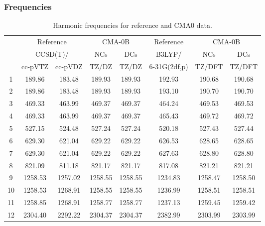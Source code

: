 \documentclass[10pt,oneside]{article}
\begin{document}
\subsubsection*{Frequencies}
\begin{table}[h!]
\centering
\caption{Harmonic frequencies for reference and CMA0 data.}
\begin{tabular}{cccccccc}
\toprule
{} & \multicolumn{2}{c}{Reference} & \multicolumn{2}{c}{CMA-0B} &    Reference & \multicolumn{2}{c}{CMA-0B} \\
{} & \multicolumn{2}{c}{CCSD(T)/} &     NCs &     DCs &       B3LYP/ &     NCs &     DCs \\
{} &   cc-pVTZ & cc-pVDZ &   TZ/DZ &   TZ/DZ & 6-31G(2df,p) &  TZ/DFT &  TZ/DFT \\
\midrule
1  &    189.86 &  183.48 &  189.93 &  189.93 &       192.93 &  190.68 &  190.68 \\
2  &    189.86 &  183.48 &  189.93 &  189.93 &       193.10 &  190.70 &  190.70 \\
3  &    469.33 &  463.99 &  469.37 &  469.37 &       464.24 &  469.53 &  469.53 \\
4  &    469.33 &  463.99 &  469.37 &  469.37 &       465.43 &  469.72 &  469.72 \\
5  &    527.15 &  524.48 &  527.24 &  527.24 &       520.18 &  527.43 &  527.44 \\
6  &    629.30 &  621.04 &  629.22 &  629.22 &       626.53 &  628.65 &  628.65 \\
7  &    629.30 &  621.04 &  629.22 &  629.22 &       627.63 &  628.80 &  628.80 \\
8  &    821.09 &  811.18 &  821.17 &  821.17 &       817.08 &  821.21 &  821.21 \\
9  &   1258.53 & 1257.02 & 1258.55 & 1258.55 &      1234.83 & 1258.47 & 1258.50 \\
10 &   1258.53 & 1268.91 & 1258.55 & 1258.55 &      1236.99 & 1258.51 & 1258.51 \\
11 &   1258.85 & 1268.91 & 1258.77 & 1258.77 &      1237.13 & 1259.45 & 1259.42 \\
12 &   2304.40 & 2292.22 & 2304.37 & 2304.37 &      2382.99 & 2303.99 & 2303.99 \\
\bottomrule
\end{tabular}
\end{table}

\clearpage
\end{document}
